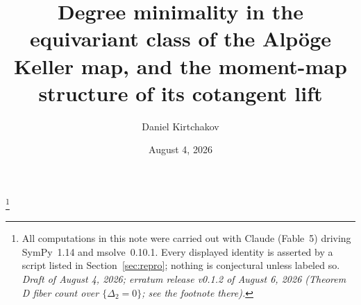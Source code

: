 \documentclass[11pt]{amsart}
\theoremstyle{plain}
\theoremstyle{definition}
\theoremstyle{remark}
\begin{document}
\title[Degree minimality and the moment map for the Alp\"oge Keller
map]{Degree minimality in the equivariant class of the Alp\"oge Keller map,
and the moment-map structure of its cotangent lift}

\author{Daniel Kirtchakov}
\address{Independent researcher}
\thanks{All computations in this note were carried out with Claude (Fable~5)
driving SymPy~1.14 and msolve~0.10.1. Every displayed identity is asserted by
a script listed in Section~\ref{sec:repro}; nothing is conjectural unless
labeled so. \emph{Draft of August 4, 2026; erratum release v0.1.2 of
August 6, 2026 (Theorem D fiber count over $\{\Delta_{2}=0\}$; see the
footnote there).}}


\date{August 4, 2026}
\end{document}
